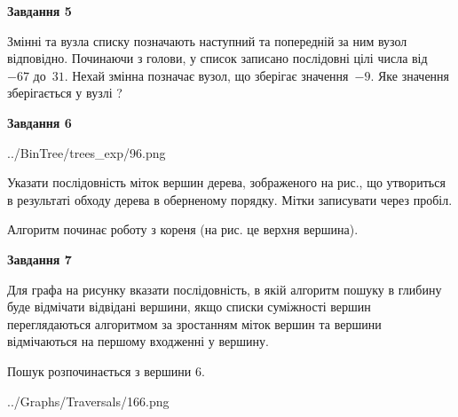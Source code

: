 \documentclass[12pt, ukrainian]{article}
\begin{document}
{\begin {large}
{\begin {center}\textbf{Завдання 5}\end {center}}\par
Змінні  та  вузла списку позначають наступний та попередній за ним вузол відповідно. Починаючи з голови, у список записано послідовні цілі числа від~$-67$ до~$31$. Нехай змінна  позначає вузол, що зберігає значення~$-9$.
Яке значення зберігається у вузлі  ?\par
\newpage

{\begin {center}\textbf{Завдання 6}\end {center}}\par

\begin{center}
	{../BinTree/trees_exp/96.png}
\end{center}
Указати послідовність міток вершин дерева, зображеного на рис., що утвориться в результаті обходу дерева в оберненому порядку. Мітки записувати через пробіл.\par Алгоритм починає роботу з кореня (на рис. це верхня вершина).\par
\newpage

{\begin {center}\textbf{Завдання 7}\end {center}}\par
Для графа на рисунку вказати послідовність, в якій алгоритм пошуку в глибину буде відмічати відвідані вершини, якщо списки суміжності вершин переглядаються алгоритмом за зростанням міток вершин та вершини відмічаються на першому вход\-женні у вершину.\par
Пошук розпочинається з вершини 6.\par

\begin{center}
	{../Graphs/Traversals/166.png}
\end{center}\par
\newpage


\end{large}}
\end{document}
